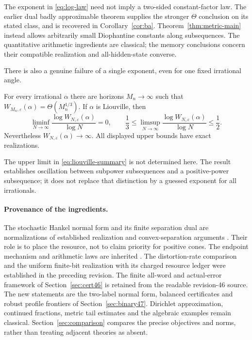 The exponent in \eqref{eq:log-law} need not imply a two-sided constant-factor law. The earlier dual badly approximable theorem supplies the stronger $\Theta$ conclusion on its stated class, and is recovered in Corollary~\ref{cor:ba}. Theorem~\ref{thm:metric-main} instead allows arbitrarily small Diophantine constants along subsequences. The quantitative arithmetic ingredients are classical; the memory conclusions concern their compatible realization and all-hidden-state converse.

There is also a genuine failure of a single exponent, even for one fixed irrational angle.
\begin{theorem}\label{thm:liouville-main}
For every irrational $\alpha$ there are horizons $M_n\to\infty$ such that
$W_{M_n,\varepsilon}(\alpha)=\Theta(M_n^{1/3})$. If $\alpha$ is Liouville, then
\begin{equation}\label{eq:liouville-summary}
 \liminf_{N\to\infty}\frac{\log W_{N,\varepsilon}(\alpha)}{\log N}=0,
 \qquad
 \frac13\le\limsup_{N\to\infty}\frac{\log W_{N,\varepsilon}(\alpha)}{\log N}
 \le\frac12.
\end{equation}
Nevertheless $W_{N,\varepsilon}(\alpha)\to\infty$. All displayed upper bounds have exact realizations.
\end{theorem}

The upper limit in \eqref{eq:liouville-summary} is not determined here. The result establishes oscillation between subpower subsequences and a positive-power subsequence; it does not replace that distinction by a guessed exponent for all irrationals.


\paragraph{Provenance of the ingredients.}
The stochastic Hankel normal form and its finite separation dual are
normalizations of established realization and convex-separation
arguments \cite{BF04,Ohta20,BPP15}. Their role is to place the resource,
not to claim priority for positive cones. The endpoint mechanism and
arithmetic laws are inherited \cite{GTF35,GTF42,GTF43}. The distortion-rate comparison and the uniform finite-bit
realization with its charged resource ledger were established in the
preceding revision. The finite all-word and actual-error framework of
Section~\ref{sec:cert46} is retained from the readable revision-46
source. The new statements are the two-label normal form, balanced
certificates and robust profile frontiers of Section~\ref{sec:binary47}. Dirichlet approximation,
continued fractions, metric tail estimates and the algebraic examples
remain classical. Section~\ref{sec:comparison} compares the precise
objectives and norms, rather than treating adjacent theories as absent.
